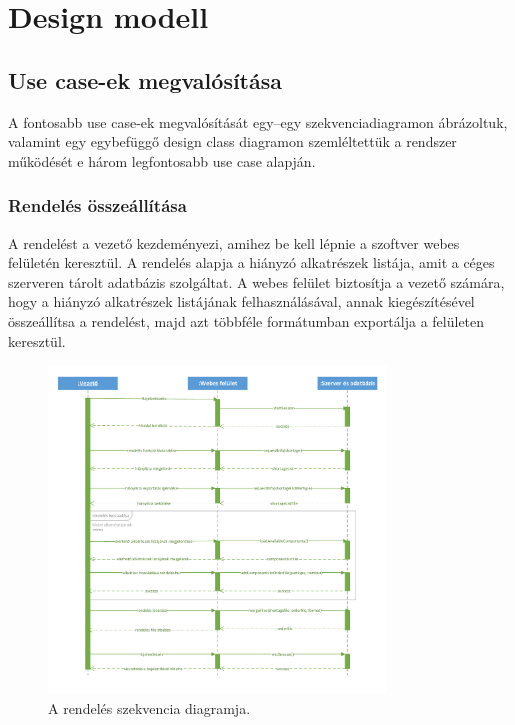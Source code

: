 \documentclass[12pt]{article}\usepackage[left=20mm,right=20mm,top=20mm,bottom=20mm]{geometry}
\begin{document}
\section{Design modell}
\subsection{Use case-ek megvalósítása}
A fontosabb use case-ek megvalósítását egy--egy szekvenciadiagramon ábrázoltuk, valamint egy egybefüggő design class diagramon szemléltettük a rendszer működését e három legfontosabb use case alapján.

\subsubsection{Rendelés összeállítása}
A rendelést a vezető kezdeményezi, amihez be kell lépnie a  szoftver webes felületén keresztül.
A rendelés alapja a hiányzó alkatrészek listája, amit a céges szerveren tárolt adatbázis szolgáltat. 
A webes felület biztosítja a vezető számára, hogy a hiányzó alkatrészek listájának felhasználásával, annak kiegészítésével összeállítsa a rendelést, majd azt többféle formátumban exportálja a felületen keresztül.

\begin{figure}[!h]
    \centering
        \includegraphics[width=0.8\textwidth]{kepek/Rendeles_szekvencia.pdf}
        \caption{A rendelés szekvencia diagramja.}
\end{figure}
\end{document}

